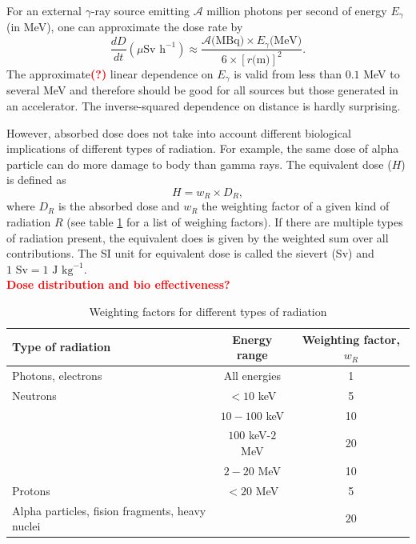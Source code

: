 \documentclass[preprint,aip,pra]{revtex4-1}
\newcommand{\red}[1]{\textcolor{red}{\bf #1}}
\begin{document}
        For an external $\gamma$-ray source emitting $\mathcal{A}$ million photons per second 
        of energy $E_{\gamma}$
        (in MeV), one can approximate the dose rate by 
        \begin{equation}
            \frac{dD}{dt}(\mu\text{Sv h}^{-1}) \approx \frac{\mathcal{A}\text{(MBq)}\times E_{\gamma}\text{(MeV)}}
            {6\times [r\text{(m)}]^2}.
        \end{equation}
        The approximate\red{(?)} linear dependence on $E_{\gamma}$ is valid from less than $0.1$ MeV to several
        MeV and therefore should be good for all sources but those generated in an accelerator.\cite{my68}
        The inverse-squared dependence on distance is hardly surprising.

        However, absorbed dose does not take into account different biological implications of different types
        of radiation.
        For example, the same dose of alpha particle can do more damage to body than gamma rays. The equivalent
        dose ($H$) is defined as
        \[H=w_R \times D_R,\]
        where $D_R$ is the absorbed dose and $w_R$ the weighting factor of a given kind of radiation $R$
        (see table \ref{tab:eq} for a list of weighing factors). If there are multiple types of radiation 
        present, the equivalent does is given by the weighted sum over all contributions. The SI unit for
        equivalent dose is called the sievert (Sv) and $1\text{ Sv}=1\text{ J kg}^{-1}$.
        \\\red{Dose distribution and bio effectiveness?}
        \begin{table}
            \label{tab:eq}
            \centering
            \caption{Weighting factors for different types of radiation\cite{icrp74}}
            \begin{ruledtabular}
                \begin{tabular}{l c c}
                Type of radiation & Energy range & Weighting factor, $w_R$\\
                \hline
                Photons, electrons & All energies & 1\\
                Neutrons & $<10$ keV & 5 \\
                         & $10-100$ keV & 10 \\
                         & $100$ keV-$2$ MeV & 20 \\
                         & $2-20$ MeV & 10 \\
                Protons & $<20$ MeV & 5 \\
                Alpha particles, fision fragments, heavy nuclei & & $20$\\
            \end{tabular}
            \end{ruledtabular}
        \end{table}
\end{document}
